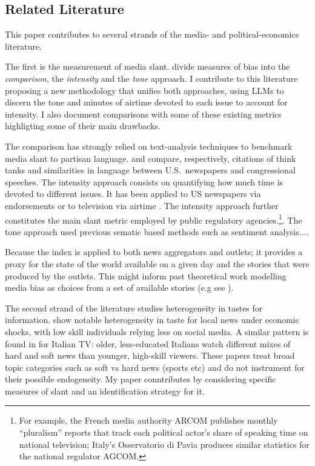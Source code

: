 \documentclass[12pt]{article}
\begin{document}
\subsection*{Related Literature}


This paper contributes to several strands of the media- and political-economics literature.


The first is the measurement of media slant. \citet{puglisi_review} divide measures of bias into  the \textit{comparison}, the \textit{intensity} and the \textit{tone }approach. I contribute to this literature proposing a new methodology that unifies both approaches, using LLMs to discern the tone and minutes of airtime devoted to each issue to account for intensity. I also document comparisons with some of these existing metrics highligting some of their main drawbacks. 

The comparison has strongly relied on text-analysis techniques to benchmark media slant to partisan language. \citet{milyo_measure} and \citet{gentzkow2010media}  compare, respectively, citations of think tanks and similarities in language between U.S.\ newspapers and congressional speeches. 
The intensity approach consists on quantifying how much time is devoted to different issues. It has been applied to US newspapers via endorsements \citep{ChiangKnight2011} or to television via airtime \citep{durante2012partisan,CageHengelHerveUrvoy2022}. 
The intensity approach further constitutes the main slant metric employed by public regulatory agencies.\footnote{For example, the French media authority ARCOM publishes monthly “pluralism” reports that track each political actor’s share of speaking time on national television; Italy’s Osservatorio di Pavia produces similar statistics for the national regulator AGCOM.}. The tone approach used previous sematic based methods such as sentiment analysis.... 

Because the index is applied to both news aggregators and outlets; it provides a proxy for the state of the world available on a given day and the stories that were produced by the outlets. This might inform past theoretical work modelling media bias as choices from a set of available stories (e.g see \cite{mullainathan, gentzkow2014media}).


The second strand of the literature studies heterogeneity in tastes for information. \cite{bang2023} show notable heterogeneity in taste for local news under economic shocks, with low skill individuals relying less on social media. A similar pattern is found in \cite{gambaro2021revealed} for Italian TV: older, less-educated Italians watch different mixes of hard and soft news than younger, high-skill viewers. These papers treat broad topic categories such as soft vs hard news (sports etc) and do not instrument for their possible endogeneity. My paper conntributes by considering specific measures of slant and an identification strategy for it. 
\end{document}
